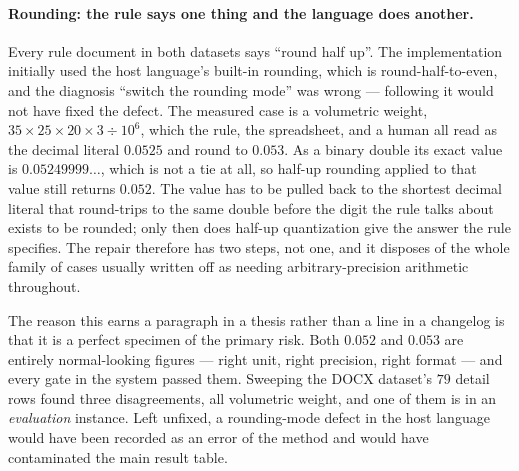 \paragraph{Rounding: the rule says one thing and the language does another.}
Every rule document in both datasets says ``round half up''. The implementation initially used
the host language's built-in rounding, which is round-half-to-even, and the diagnosis
``switch the rounding mode'' was wrong --- following it would not have fixed the defect. The
measured case is a volumetric weight, $35 \times 25 \times 20 \times 3 \div 10^{6}$, which the
rule, the spreadsheet, and a human all read as the decimal literal $0.0525$ and round to
$0.053$. As a binary double its exact value is $0.05249999\ldots$, which is not a tie at all,
so half-up rounding applied to that value still returns $0.052$. The value has to be pulled
back to the shortest decimal literal that round-trips to the same double before the digit the
rule talks about exists to be rounded; only then does half-up quantization give the answer the
rule specifies. The repair therefore has two steps, not one, and it disposes of the whole
family of cases usually written off as needing arbitrary-precision arithmetic throughout.

The reason this earns a paragraph in a thesis rather than a line in a changelog is that it is a
perfect specimen of the primary risk. Both $0.052$ and $0.053$ are entirely normal-looking
figures --- right unit, right precision, right format --- and every gate in the system passed
them. Sweeping the DOCX dataset's $79$ detail rows found three disagreements, all volumetric
weight, and one of them is in an \emph{evaluation} instance. Left unfixed, a rounding-mode
defect in the host language would have been recorded as an error of the method and would have
contaminated the main result table.

